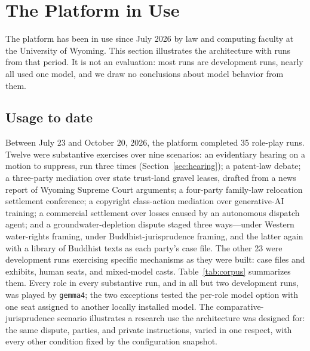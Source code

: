 \documentclass[acmsmall,screen,review]{acmart}
\newcommand{\code}[1]{\texttt{\small #1}}
\begin{document}
\section{The Platform in Use}
\label{sec:use}

The platform has been in use since July 2026 by law and computing faculty at the University of Wyoming. This section illustrates the architecture with runs from that period. It is not an evaluation: most runs are development runs, nearly all used one model, and we draw no conclusions about model behavior from them.

\subsection{Usage to date}

Between July 23 and October 20, 2026, the platform completed 35 role-play runs. Twelve were substantive exercises over nine scenarios: an evidentiary hearing on a motion to suppress, run three times (Section~\ref{sec:hearing}); a patent-law debate; a three-party mediation over state trust-land gravel leases, drafted from a news report of Wyoming Supreme Court arguments; a four-party family-law relocation settlement conference; a copyright class-action mediation over generative-AI training; a commercial settlement over losses caused by an autonomous dispatch agent; and a groundwater-depletion dispute staged three ways---under Western water-rights framing, under Buddhist-jurisprudence framing, and the latter again with a library of Buddhist texts as each party's case file. The other 23 were development runs exercising specific mechanisms as they were built: case files and exhibits, human seats, and mixed-model casts. Table~\ref{tab:corpus} summarizes them. Every role in every substantive run, and in all but two development runs, was played by \code{gemma4}; the two exceptions tested the per-role model option with one seat assigned to another locally installed model. The comparative-jurisprudence scenario illustrates a research use the architecture was designed for: the same dispute, parties, and private instructions, varied in one respect, with every other condition fixed by the configuration snapshot.
\end{document}
